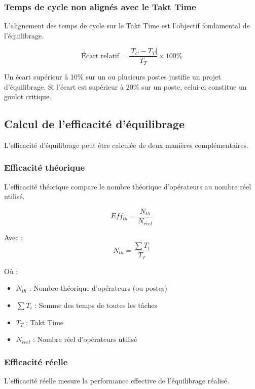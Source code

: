 \documentclass[12pt,a4paper]{article}
\newenvironment{importantnote}
  {\begin{tcolorbox}[colback=blue!5!white, colframe=blue!50!black, title=\textbf{Point Important}]\small}
  {\end{tcolorbox}}
\begin{document}
\subsubsection{Temps de cycle non alignés avec le Takt Time}

L'alignement des temps de cycle sur le Takt Time est l'objectif fondamental de l'équilibrage.

\[
\text{Écart relatif} = \frac{|T_C - T_T|}{T_T} \times 100\%
\]

\begin{importantnote}
Un écart supérieur à 10\% sur un ou plusieurs postes justifie un projet d'équilibrage. Si l'écart est supérieur à 20\% sur un poste, celui-ci constitue un goulot critique.
\end{importantnote}

\subsection{Calcul de l'efficacité d'équilibrage}

L'efficacité d'équilibrage peut être calculée de deux manières complémentaires.

\subsubsection{Efficacité théorique}

L'efficacité théorique compare le nombre théorique d'opérateurs au nombre réel utilisé.

\[
\boxed{Eff_{th} = \frac{N_{th}}{N_{r\acute{e}el}}}
\]

Avec :
\[
N_{th} = \frac{\sum T_i}{T_T}
\]

Où :
\begin{itemize}
    \item $N_{th}$ : Nombre théorique d'opérateurs (ou postes)
    \item $\sum T_i$ : Somme des temps de toutes les tâches
    \item $T_T$ : Takt Time
    \item $N_{r\acute{e}el}$ : Nombre réel d'opérateurs utilisé
\end{itemize}

\subsubsection{Efficacité réelle}

L'efficacité réelle mesure la performance effective de l'équilibrage réalisé.
\end{document}
